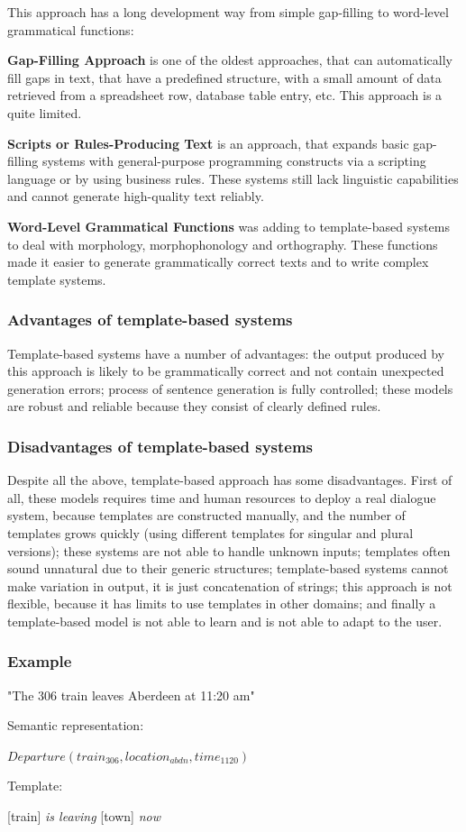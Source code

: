 This approach has a long development way from simple gap-filling to word-level grammatical functions:

\textbf{Gap-Filling Approach} is one of the oldest approaches, that can automatically fill gaps in text, that have a predefined structure, with a small amount of data retrieved from a spreadsheet row, database table entry, etc. This approach is a quite limited.

\textbf{Scripts or Rules-Producing Text} is an approach, that expands basic gap-filling systems with general-purpose programming constructs via a scripting language or by using business rules. These systems still lack linguistic capabilities and cannot generate high-quality text reliably.

\textbf{Word-Level Grammatical Functions} was adding to template-based systems to deal with morphology, morphophonology and orthography. These functions made it easier to generate grammatically correct texts and to write complex template systems.

\subsubsection{Advantages of template-based systems}
Template-based systems have a number of advantages: the output produced by this approach is likely to be grammatically correct and not contain unexpected generation errors; process of sentence generation is fully controlled; these models are robust and reliable because they consist of clearly defined rules.

\subsubsection{Disadvantages of template-based systems}
Despite all the above, template-based approach has some disadvantages. First of all, these models requires time and human resources to deploy a real dialogue system, because templates are constructed manually, and the number of templates grows quickly (using different templates for singular and plural versions); these systems are not able to handle unknown inputs; templates often sound unnatural due to their generic structures; template-based systems cannot make variation in output, it is just concatenation of strings; this approach is not flexible, because it has limits to use templates in other domains; and finally a template-based model is not able to learn and is not able to adapt to the user.

\begin{center}
\subsubsection{Example}\label{tb_example} 
"The 306 train leaves Aberdeen at 11:20 am"

\vspace{5mm}
Semantic representation: 

$Departure(train_{306}, location_{abdn}, time_{1120})$

\vspace{5mm}
Template: 

[train] \textit{is leaving} [town] \textit{now}
\end{center}

